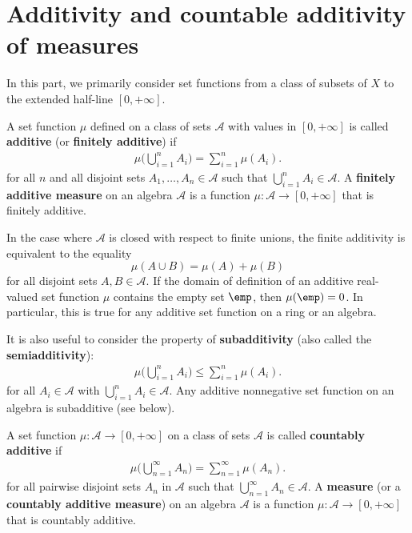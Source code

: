 \section{Additivity and countable additivity of measures}
In this part, we primarily consider set functions from a class of subsets of $X$ to the extended half-line $[0,+\infty]$.
\begin{definition}
A set function $\mu$ defined on a class of sets $\mathcal{A}$ with values in $[0,+\infty]$ is called \textbf{additive} (or \textbf{finitely additive}) if
\begin{align}\label{measure additive def}
\mu\Big(\bigcup_{i=1}^{n}A_i\Big)=\sum_{i=1}^{n}\mu(A_i).
\end{align}
for all $n$ and all disjoint sets $A_1,\dots,A_n\in\mathcal{A}$ such that $\bigcup_{i=1}^{n}A_i\in\mathcal{A}$. A \textbf{finitely additive measure} on an algebra $\mathcal{A}$ is a function $\mu:\mathcal{A}\to[0,+\infty]$ that is finitely additive.
\end{definition}
In the case where $\mathcal{A}$ is closed with respect to finite unions, the finite additivity is equivalent to the equality
\[\mu(A\cup B)=\mu(A)+\mu(B)\]
for all disjoint sets $A,B\in\mathcal{A}$. If the domain of definition of an additive real-valued set function $\mu$ contains the empty set $\emp$, then $\mu(\emp)=0$. In particular, this is true for any additive set function on a ring or an algebra.\par
It is also useful to consider the property of \textbf{subadditivity} (also called the \textbf{semiadditivity}):
\begin{align}\label{measure subadditive def}
\mu\Big(\bigcup_{i=1}^{n}A_i\Big)\leq\sum_{i=1}^{n}\mu(A_i).
\end{align}
for all $A_i\in\mathcal{A}$ with $\bigcup_{i=1}^{n}A_i\in\mathcal{A}$. Any additive nonnegative set function on an algebra is subadditive (see below).
\begin{definition}
A set function $\mu:\mathcal{A}\to[0,+\infty]$ on a class of sets $\mathcal{A}$ is called \textbf{countably additive} if
\begin{align}\label{measure sigma additive def}
\mu\Big(\bigcup_{n=1}^{\infty}A_n\Big)=\sum_{n=1}^{\infty}\mu(A_n).
\end{align}
for all pairwise disjoint sets $A_n$ in $\mathcal{A}$ such that $\bigcup_{n=1}^{\infty}A_n\in\mathcal{A}$. A \textbf{measure} (or a \textbf{countably additive measure}) on an algebra $\mathcal{A}$ is a function $\mu:\mathcal{A}\to[0,+\infty]$ that is countably additive.
\end{definition}
